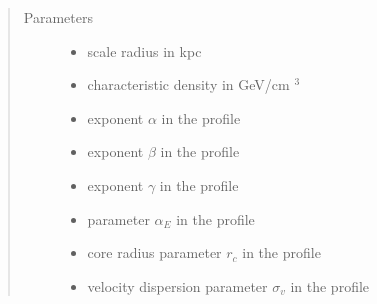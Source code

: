 \documentclass[letterpaper,10pt,english]{sphinxmanual}
\begin{document}
\begin{fulllineitems}
\begin{itemize}
\end{itemize}
\begin{quote}\begin{description}
\item[{Parameters}] \leavevmode\begin{itemize}
\item {} 
\sphinxAtStartPar
{} \textendash{} scale radius in kpc

\item {} 
\sphinxAtStartPar
{} \textendash{} characteristic density in GeV/cm \({}^3\)

\item {} 
\sphinxAtStartPar
{} \textendash{} exponent \(\alpha\) in the {\hyperref[\detokenize{diffsph.profiles:diffsph.profiles.templates.hdz}]{}} profile

\item {} 
\sphinxAtStartPar
{} \textendash{} exponent \(\beta\) in the {\hyperref[\detokenize{diffsph.profiles:diffsph.profiles.templates.hdz}]{}} profile

\item {} 
\sphinxAtStartPar
{} \textendash{} exponent \(\gamma\) in the {\hyperref[\detokenize{diffsph.profiles:diffsph.profiles.templates.hdz}]{}} profile

\item {} 
\sphinxAtStartPar
{} \textendash{} parameter \(\alpha_E\) in the {\hyperref[\detokenize{diffsph.profiles:diffsph.profiles.templates.enst}]{}} profile

\item {} 
\sphinxAtStartPar
{} \textendash{} core radius parameter \(r_c\) in the {\hyperref[\detokenize{diffsph.profiles:diffsph.profiles.templates.cnfw}]{}} profile

\item {} 
\sphinxAtStartPar
{} \textendash{} velocity dispersion parameter \(\sigma_v\) in the {\hyperref[\detokenize{diffsph.profiles:diffsph.profiles.templates.sis}]{}} profile


\end{itemize}
\end{description}
\end{quote}
\end{fulllineitems}
\end{document}
